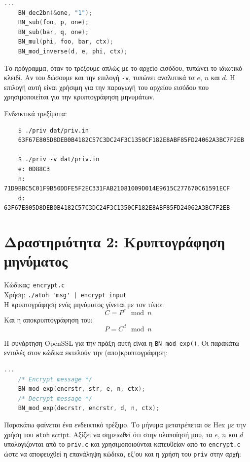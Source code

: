 \documentclass[12pt]{article}
\begin{document}
\begin{lstlisting}[language=C]
	...
	BN_dec2bn(&one, "1");
	BN_sub(foo, p, one);
	BN_sub(bar, q, one);
	BN_mul(phi, foo, bar, ctx);
	BN_mod_inverse(d, e, phi, ctx);
\end{lstlisting}

Το πρόγραμμα, όταν το τρέξουμε απλώς με το αρχείο εισόδου, τυπώνει το
ιδιωτικό κλειδί. Αν του δώσουμε και την επιλογή \lstinline{-v}, τυπώνει
αναλυτικά τα $e$, $n$ και $d$. Η επιλογή αυτή είναι χρήσιμη για την
παραγωγή του αρχείου εισόδου που χρησιμοποιείται για την κρυπτογράφηση
μηνυμάτων.

Ενδεικτικά τρεξίματα: \\

\begin{lstlisting}
	$ ./priv dat/priv.in
	63F67E805D8DEB0B4182C57C3DC24F3C1350CF182E8ABF85FD24062A3BC7F2EB

	$ ./priv -v dat/priv.in
	e: 0D88C3
	n: 71D9BBC5C01F9B50DDFE5F2EC331FAB21081009D014E9615C277670C61591ECF
	d: 63F67E805D8DEB0B4182C57C3DC24F3C1350CF182E8ABF85FD24062A3BC7F2EB
\end{lstlisting}

\section{Δραστηριότητα 2: Κρυπτογράφηση μηνύματος}

Κώδικας: \lstinline{encrypt.c} \\
Χρήση: \lstinline{./atoh 'msg' | encrypt input} \\

Η κρυπτογράφηση ενός μηνύματος γίνεται με τον τύπο:
\[C = P^e \mod n\]
Και η αποκρυπτογράφηση του:
\[P = C^d \mod n\]

Η συνάρτηση OpenSSL για την πράξη αυτή είναι η \lstinline{BN_mod_exp()}. Οι
παρακάτω εντολές στον κώδικα εκτελούν την (απο)κρυπτογράφηση: \\

\begin{lstlisting}[language=C]
	...
	/* Encrypt message */
	BN_mod_exp(encrstr, str, e, n, ctx);
	/* Decrypt message */
	BN_mod_exp(decrstr, encrstr, d, n, ctx);
\end{lstlisting}

Παρακάτω φαίνεται ένα ενδεικτικό τρέξιμο. Το μήνυμα μετατρέπεται σε Hex με την
χρήση του \lstinline{atoh} script. Αξίζει να σημειωθεί ότι στην υλοποίησή μου,
τα $e$, $n$ και $d$ υπολογίζονται από το \lstinline{priv.c} και
χρησιμοποιούνται κατευθείαν από το \lstinline{encrypt.c} ώστε να αποφευχθεί η
επανάληψη κώδικα, εξ'ου και η χρήση του \lstinline{priv} στην αρχή: \\
\end{document}
